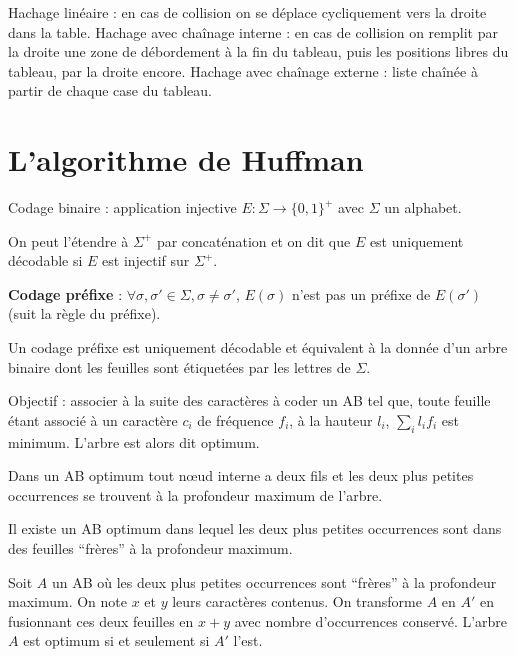 \documentclass[a4paper,11pt,twocolumn]{article}
\begin{document}
	\begin{defn}
	Hachage linéaire : en cas de collision on se déplace cycliquement vers la droite dans la table.
	Hachage avec chaînage interne : en cas de collision on remplit par la droite une zone de débordement à la fin du tableau, puis les positions libres du tableau, par la droite encore.
	Hachage avec chaînage externe : liste chaînée à partir de chaque case du tableau.
	\end{defn}


\section{L'algorithme de Huffman}

	\begin{defn}
	Codage binaire : application injective $E \colon \Sigma \to \{ 0,1 \}^+$ avec $\Sigma$ un alphabet.
	\end{defn}

	On peut l'étendre à $\Sigma^+$ par concaténation et on dit que $E$ est uniquement décodable si $E$ est injectif sur $\Sigma^+$.

	\begin{defn}
	\textbf{Codage préfixe} : $\forall \sigma, \sigma' \in \Sigma, \sigma \neq \sigma'$, $E(\sigma)$ n'est pas un préfixe de $E(\sigma')$ (suit la règle du préfixe).
	\end{defn}

	\begin{pop}
	Un codage préfixe est uniquement décodable et équivalent à la donnée d'un arbre binaire dont les feuilles sont étiquetées par les lettres de $\Sigma$.
	\end{pop}

	Objectif : associer à la suite des caractères à coder un AB tel que, toute feuille étant associé à un caractère $c_i$ de fréquence $f_i$, à la hauteur $l_i$, $\sum_i l_i f_i$ est minimum.
	L'arbre est alors dit optimum.

	\begin{lem}
	Dans un AB optimum tout nœud interne a deux fils et les deux plus petites occurrences se trouvent à la profondeur maximum de l'arbre.
	\end{lem}

	\begin{lem}
	Il existe un AB optimum dans lequel les deux plus petites occurrences sont dans des feuilles “frères” à la profondeur maximum.
	\end{lem}

	\begin{lem}
	Soit $A$ un AB où les deux plus petites occurrences sont “frères” à la profondeur maximum.
	On note $x$ et $y$ leurs caractères contenus.
	On transforme $A$ en $A'$ en fusionnant ces deux feuilles en $x + y$ avec nombre d'occurrences conservé.
	L'arbre $A$ est optimum si et seulement si $A'$ l'est.
	\end{lem}
\end{document}

